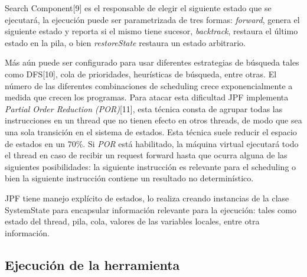 \documentclass[runningheads]{llncs}
\begin{document}
Search Component[9] es el responsable de elegir el siguiente estado que se ejecutar\'a, la ejecuci\'on puede ser parametrizada de tres formas: \textit{forward}, genera el siguiente estado y reporta si el mismo tiene sucesor, \textit{backtrack}, restaura el \'ultimo estado en la pila, o bien \textit{restoreState} restaura un estado arbitrario.

M\'as a\'un puede ser configurado para usar diferentes estrategias de b\'usqueda tales como DFS[10], cola de prioridades, heur\'isticas de b\'usqueda,  entre otras.
El n\'umero de las diferentes combinaciones de scheduling crece exponencialmente a medida que crecen los programas. Para atacar esta dificultad JPF implementa \textit{Partial Order Reduction (POR)}[11], esta t\'ecnica consta de agrupar todas las instrucciones en un thread que no tienen efecto en otros threads, de modo que sea una sola transici\'on en el sistema de estados. Esta t\'ecnica suele reducir el espacio de estados en un 70\%.
Si \textit{POR} est\'a habilitado, la máquina virtual ejecutar\'a todo el thread en caso de recibir un request forward hasta que ocurra alguna de las siguientes posibilidades: la siguiente instrucci\'on es relevante para el scheduling o bien la siguiente instrucci\'on contiene un resultado no determin\'istico.

JPF tiene manejo expl\'icito de estados, lo realiza creando instancias de la clase SystemState para encapsular informaci\'on relevante para la ejecuci\'on: tales como estado del thread, pila, cola, valores de las variables locales, entre otra informaci\'on.

\subsection{Ejecuci\'on de la herramienta}
\end{document}
